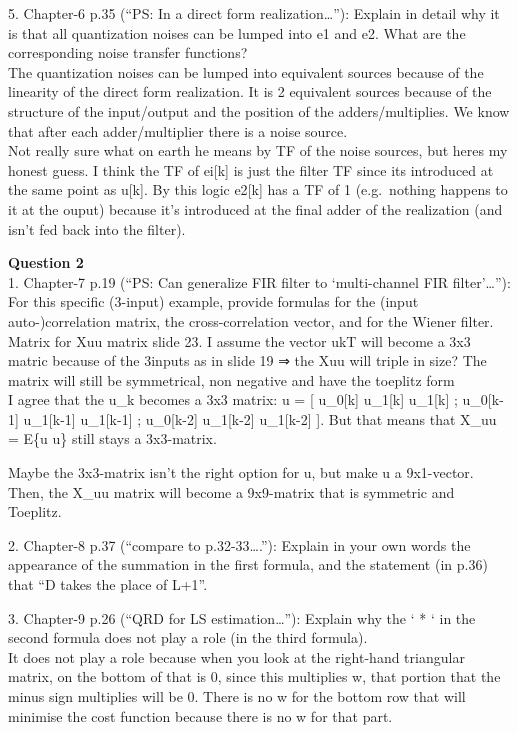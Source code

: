 \documentclass[
  a4paper,
  ,captions=tableheading
]{scrartcl}
\begin{document}
5. Chapter-6 p.35 (``PS: In a direct form realization\ldots''): Explain
in detail why it is that all quantization noises can be lumped into e1
and e2. What are the corresponding noise transfer functions?\\
The quantization noises can be lumped into equivalent sources because of
the linearity of the direct form realization. It is 2 equivalent sources
because of the structure of the input/output and the position of the
adders/multiplies. We know that after each adder/multiplier there is a
noise source.\\
Not really sure what on earth he means by TF of the noise sources, but
heres my honest guess. I think the TF of ei{[}k{]} is just the filter TF
since its introduced at the same point as u{[}k{]}. By this logic
e2{[}k{]} has a TF of 1 (e.g.~nothing happens to it at the ouput)
because it's introduced at the final adder of the realization (and isn't
fed back into the filter).

\textbf{Question 2}\\
1. Chapter-7 p.19 (``PS: Can generalize FIR filter to `multi-channel FIR
filter'\ldots''): For this specific (3-input) example, provide formulas
for the (input auto-)correlation matrix, the cross-correlation vector,
and for the Wiener filter.\\
Matrix for Xuu matrix slide 23. I assume the vector ukT will become a
3x3 matric because of the 3inputs as in slide 19 ⇒ the Xuu will triple
in size? The matrix will still be symmetrical, non negative and have the
toeplitz form\\
I agree that the u\_k becomes a 3x3 matrix: u = {[} u\_0{[}k{]}
u\_1{[}k{]} u\_1{[}k{]} ; u\_0{[}k-1{]} u\_1{[}k-1{]} u\_1{[}k-1{]} ;
u\_0{[}k-2{]} u\_1{[}k-2{]} u\_1{[}k-2{]} {]}. But that means that X\_uu
= E\{u u\} still stays a 3x3-matrix.

Maybe the 3x3-matrix isn't the right option for u, but make u a
9x1-vector. Then, the X\_uu matrix will become a 9x9-matrix that is
symmetric and Toeplitz.

2. Chapter-8 p.37 (``compare to p.32-33\ldots.''): Explain in your own
words the appearance of the summation in the first formula, and the
statement (in p.36) that ``D takes the place of L+1''.

3. Chapter-9 p.26 (``QRD for LS estimation\ldots''): Explain why the ` *
` in the second formula does not play a role (in the third formula).\\
It does not play a role because when you look at the right-hand
triangular matrix, on the bottom of that is 0, since this multiplies w,
that portion that the minus sign multiplies will be 0. There is no w for
the bottom row that will minimise the cost function because there is no
w for that part.
\end{document}
